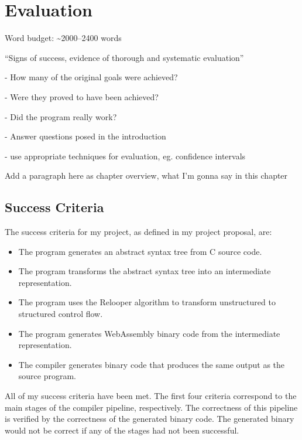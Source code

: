 \documentclass[00-main.tex]{subfiles}
\begin{document}
\chapter{Evaluation}

\newcommand{\IncludeStackPlot}[1]{\resizebox{0.98\textwidth}{!}{}}

\begin{Comment}
Word budget: \textasciitilde 2000--2400 words
\end{Comment}

\begin{Comment}
``Signs of success, evidence of thorough and systematic evaluation''

- How many of the original goals were achieved?

- Were they proved to have been achieved?

- Did the program really work?

- Answer questions posed in the introduction

- use appropriate techniques for evaluation, eg. confidence intervals
\end{Comment}

\begin{Comment}
Add a paragraph here as chapter overview, what I'm gonna say in this chapter
\end{Comment}


\section{Success Criteria}

The success criteria for my project, as defined in my project proposal, are:
\begin{itemize}
\item The program generates an abstract syntax tree from C source code.
\item The program transforms the abstract syntax tree into an intermediate representation.
\item The program uses the Relooper algorithm to transform unstructured to structured control
flow.
\item The program generates WebAssembly binary code from the intermediate representation.
\item The compiler generates binary code that produces the same output as the source program.
\end{itemize}

All of my success criteria have been met.
The first four criteria correspond to the main stages of the compiler pipeline, respectively.
The correctness of this pipeline is verified by the correctness of the generated binary code.
The generated binary would not be correct if any of the stages had not been successful.
\end{document}
